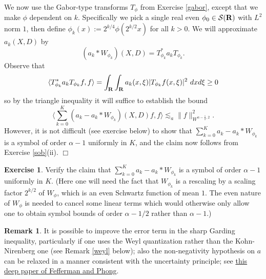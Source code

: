 \documentclass[11pt]{article}
\theoremstyle{definition}
\newtheorem{exercise}[theorem]{Exercise}
\newtheorem{remark}[theorem]{Remark}
\begin{document}
We now use the Gabor-type transforms \({T_\phi}\) from Exercise \ref{gabor}, except that we make \({\phi}\) dependent on \({k}\). Specifically we pick a single real even \({\phi_0 \in {\mathcal S}({\bf R})}\) with \({L^2}\) norm \({1}\), then define \({\phi_k(x) := 2^{k/4} \phi(2^{k/2} x)}\) for all \({k>0}\). We will approximate \({a_k(X,D)}\) by 
\[\displaystyle  (a_k * W_{\phi_k})(X,D) = T_{\phi_k}^* a_k T_{\phi_k}.\]
 Observe that 
\[\displaystyle  \langle T_{\phi_k}^* a_k T_{\phi_k} f, f \rangle = \int_{\bf R} \int_{\bf R} a_k(x,\xi) |T_{\phi_k}f(x,\xi)|^2\ dx d\xi \geq 0\]
 so by the triangle inequality it will suffice to establish the bound 
\[\displaystyle  \langle \sum_{k=0}^K (a_k - a_k * W_{\phi_k})(X,D) f, f \rangle \lesssim_a \|f\|_{W^{\alpha-\frac{1}{2},2}}^2.\]
 However, it is not difficult (see exercise below) to show that \({\sum_{k=0}^K a_k - a_k * W_{\phi_k}}\) is a symbol of order \({\alpha-1}\) uniformly in \({K}\), and the claim now follows from Exercise \ref{sob}(ii). \(\Box\)
\begin{exercise}
  Verify the claim that \({\sum_{k=0}^K a_k - a_k * W_{\phi_k}}\) is a symbol of order \({\alpha-1}\) uniformly in \({K}\). (Here one will need the fact that \({W_{\phi_k}}\) is a rescaling by a scaling factor \({2^{k/2}}\) of \({W_\phi}\), which is an even Schwartz function of mean \({1}\). The even nature of \({W_\phi}\) is needed to cancel some linear terms which would otherwise only allow one to obtain symbol bounds of order \({\alpha-1/2}\) rather than \({\alpha-1}\).) 
\end{exercise}
\begin{remark}
  It is possible to improve the error term in the sharp Garding inequality, particularly if one uses the Weyl quantization rather than the Kohn-Nirenberg one (see Remark \ref{weyl} below); also the non-negativity hypothesis on \({a}\) can be relaxed in a manner consistent with the uncertainty principle; see \href{https://mathscinet.ams.org/mathscinet-getitem?mr=611747}{this deep paper of Fefferman and Phong}. 
\end{remark}
\end{document}
